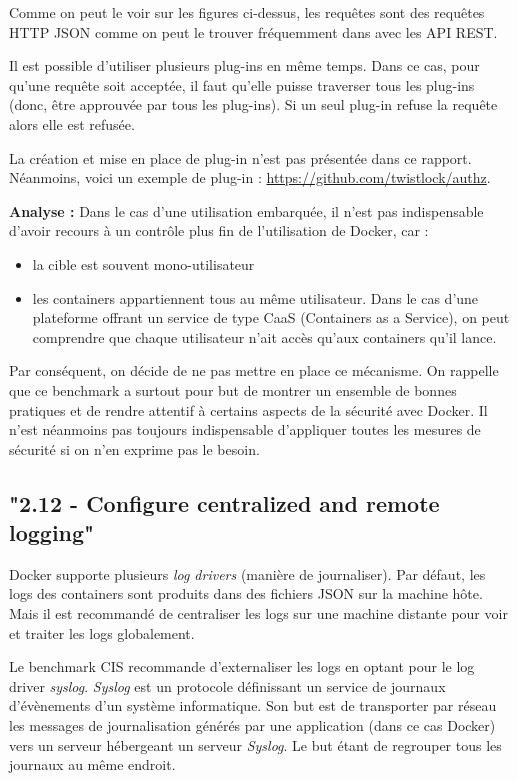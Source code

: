 \documentclass[11pt,a4paper,oneside]{report}
\begin{document}

Comme on peut le voir sur les figures ci-dessus, les requêtes sont des requêtes HTTP JSON comme on peut le trouver fréquemment dans avec les API REST.

Il est possible d'utiliser plusieurs plug-ins en même temps. Dans ce cas, pour qu'une requête soit acceptée, il faut qu'elle puisse traverser tous les plug-ins (donc, être approuvée par tous les plug-ins). Si un seul plug-in refuse la requête alors elle est refusée.

La création et mise en place de plug-in n'est pas présentée dans ce rapport. Néanmoins, voici un exemple de plug-in : \url{https://github.com/twistlock/authz}.

\textbf{Analyse : } Dans le cas d'une utilisation embarquée, il n'est pas indispensable d'avoir recours à un contrôle plus fin de l'utilisation de Docker, car :
\begin{itemize}
\item la cible est souvent mono-utilisateur
\item les containers appartiennent tous au même utilisateur. Dans le cas d'une plateforme offrant un service de type CaaS (Containers as a Service), on peut comprendre que chaque utilisateur n'ait accès qu'aux containers qu'il lance.
\end{itemize}
Par conséquent, on décide de ne pas mettre en place ce mécanisme. On rappelle que ce benchmark a surtout pour but de montrer un ensemble de bonnes pratiques et de rendre attentif à certains aspects de la sécurité avec Docker. Il n'est néanmoins pas toujours indispensable d'appliquer toutes les mesures de sécurité si on n’en exprime pas le besoin.


\subsection{"2.12 - Configure centralized and remote logging"}
Docker supporte plusieurs \textit{log drivers} (manière de journaliser). Par défaut, les logs des containers sont produits dans des fichiers JSON sur la machine hôte. Mais il est recommandé de centraliser les logs sur une machine distante pour voir et traiter les logs globalement.

Le benchmark CIS recommande d'externaliser les logs en optant pour le log driver \textit{syslog}. \textit{Syslog}\cite{developpez_syslog}\cite{wiki_syslog} est un protocole définissant un service de journaux d'évènements d'un système informatique. Son but est de transporter par réseau les messages de journalisation générés par une application (dans ce cas Docker) vers un serveur hébergeant un serveur \textit{Syslog}. Le but étant de regrouper tous les journaux au même endroit.
\end{document}
